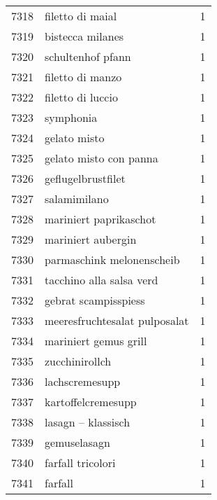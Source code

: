 \begin{tabular}{llr}
7318 &                                   filetto di maial &      1 \\
7319 &                                   bistecca milanes &      1 \\
7320 &                                  schultenhof pfann &      1 \\
7321 &                                   filetto di manzo &      1 \\
7322 &                                  filetto di luccio &      1 \\
7323 &                                          symphonia &      1 \\
7324 &                                       gelato misto &      1 \\
7325 &                             gelato misto con panna &      1 \\
7326 &                                 geflugelbrustfilet &      1 \\
7327 &                                       salamimilano &      1 \\
7328 &                             mariniert paprikaschot &      1 \\
7329 &                                 mariniert aubergin &      1 \\
7330 &                          parmaschink melonenscheib &      1 \\
7331 &                           tacchino alla salsa verd &      1 \\
7332 &                               gebrat scampisspiess &      1 \\
7333 &                      meeresfruchtesalat pulposalat &      1 \\
7334 &                              mariniert gemus grill &      1 \\
7335 &                                     zucchinirollch &      1 \\
7336 &                                     lachscremesupp &      1 \\
7337 &                                 kartoffelcremesupp &      1 \\
7338 &                                 lasagn – klassisch &      1 \\
7339 &                                       gemuselasagn &      1 \\
7340 &                                  farfall tricolori &      1 \\
7341 &                                            farfall &      1 \\

\end{tabular}
